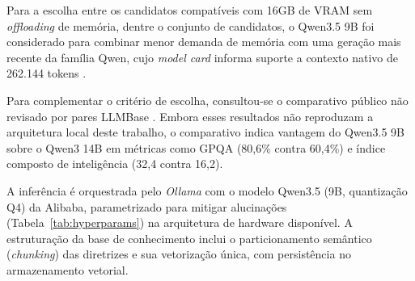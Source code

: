\documentclass[12pt]{article}
\begin{document}

Para a escolha entre os candidatos compatíveis com 16GB de VRAM sem \textit{offloading} de memória, dentre o conjunto de candidatos, o Qwen3.5 9B foi considerado para combinar menor demanda de memória com uma geração mais recente da família Qwen, cujo \textit{model card} informa suporte a contexto nativo de 262.144 tokens \cite{Qwen35ModelCard2026}.

Para complementar o critério de escolha, consultou-se o comparativo público não revisado por pares LLMBase \cite{benchmarks_llm}. Embora esses resultados não reproduzam a arquitetura local deste trabalho, o comparativo indica vantagem do Qwen3.5 9B sobre o Qwen3 14B em métricas como GPQA (80,6\% contra 60,4\%) e índice composto de inteligência (32,4 contra 16,2).

A inferência é orquestrada pelo \textit{Ollama} com o modelo Qwen3.5 (9B, quantização Q4) da Alibaba, parametrizado para mitigar alucinações (Tabela~\ref{tab:hyperparams}) na arquitetura de hardware disponível.
A estruturação da base de conhecimento inclui o particionamento semântico (\textit{chunking}) das diretrizes e sua vetorização única, com persistência no armazenamento vetorial.
\end{document}
